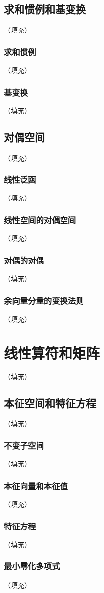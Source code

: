 \documentclass[hyperref,UTF8]{ctexbook}
\begin{document}
\section{求和惯例和基变换}（填充）
\subsection{求和惯例}（填充）
\subsection{基变换}（填充）
\section{对偶空间}（填充）
\subsection{线性泛函}（填充）
\subsection{线性空间的对偶空间}（填充）
\subsection{对偶的对偶}（填充）
\subsection{余向量分量的变换法则}（填充）
\chapter{线性算符和矩阵}（填充）
\section{本征空间和特征方程}（填充）
\subsection{不变子空间}（填充）
\subsection{本征向量和本征值}（填充）
\subsection{特征方程}（填充）
\subsection{最小零化多项式}（填充）
\end{document}
